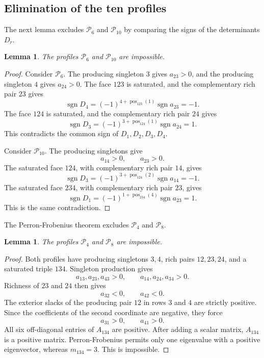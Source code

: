 \documentclass[11pt,a4paper]{article}
\newtheorem{lemma}[theorem]{Lemma}
\theoremstyle{definition}
\DeclareMathOperator{\sgn}{sgn}
\begin{document}
\subsection{Elimination of the ten profiles}

The next lemma excludes $\mathcal P_6$ and $\mathcal P_{10}$ by
comparing the signs of the determinants $D_r$.

\begin{lemma}
\label{lem:remove-observability-profiles}
The profiles $\mathcal P_6$ and $\mathcal P_{10}$ are impossible.
\end{lemma}

\begin{proof}
Consider $\mathcal P_6$. The producing singleton $3$ gives
$a_{23}>0$, and
the producing singleton $4$ gives $a_{24}>0$. The face $123$ is
saturated, and the complementary rich pair $23$ gives
$$
\sgn D_4
=
(-1)^{4+\operatorname{pos}_{123}(1)}\sgn a_{23}
=-1.
$$
The face $124$ is saturated, and the complementary rich pair $24$ gives
$$
\sgn D_3
=
(-1)^{3+\operatorname{pos}_{124}(1)}\sgn a_{24}
=1.
$$
This contradicts the common sign of $D_1,D_2,D_3,D_4$.

Consider $\mathcal P_{10}$. The producing singletons give
$$
a_{14}>0,\qquad a_{23}>0.
$$
The saturated face $124$, with complementary rich pair $14$, gives
$$
\sgn D_3
=
(-1)^{3+\operatorname{pos}_{124}(2)}\sgn a_{14}
=-1.
$$
The saturated face $234$, with complementary rich pair $23$, gives
$$
\sgn D_1
=
(-1)^{1+\operatorname{pos}_{234}(4)}\sgn a_{23}
=1.
$$
This is the same contradiction.
\end{proof}

The Perron-Frobenius theorem excludes $\mathcal P_4$ and
$\mathcal P_8$.

\begin{lemma}
\label{lem:remove-positive-submatrix-profiles}
The profiles $\mathcal P_4$ and $\mathcal P_8$ are impossible.
\end{lemma}

\begin{proof}
Both profiles have producing singletons $3,4$, rich pairs $12,23,24$,
and a saturated triple $134$. Singleton production gives
$$
a_{13},a_{23},a_{43}>0,
\qquad
a_{14},a_{24},a_{34}>0.
$$
Richness of $23$ and $24$ then gives
$$
a_{32}<0,\qquad a_{42}<0.
$$
The exterior slacks of the producing pair $12$ in rows $3$ and $4$ are
strictly positive. Since the coefficients of the second coordinate are
negative, they force
$$
a_{31}>0,\qquad a_{41}>0.
$$
All six off-diagonal entries of $A_{134}$ are positive. After adding a
scalar matrix, $A_{134}$ is a positive matrix. Perron-Frobenius permits
only one eigenvalue with a positive eigenvector, whereas $m_{134}=3$.
This is impossible.
\end{proof}
\end{document}
